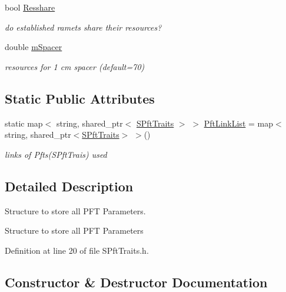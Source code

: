 \begin{DoxyCompactItemize}
bool \mbox{\hyperlink{class_s_pft_traits_aa45d6adb471357506db921078429845e}{Resshare}}
\begin{DoxyCompactList}\small\item\em do established ramets share their resources? \end{DoxyCompactList}\item 
\mbox{\label{class_s_pft_traits_aba851aa2c86f0a498bc8476c14d46e77}} 
double \mbox{\hyperlink{class_s_pft_traits_aba851aa2c86f0a498bc8476c14d46e77}{m\+Spacer}}
\begin{DoxyCompactList}\small\item\em resources for 1 cm spacer (default=70) \end{DoxyCompactList}\end{DoxyCompactItemize}
\subsection*{Static Public Attributes}
\begin{DoxyCompactItemize}
\item 
static map$<$ string, shared\+\_\+ptr$<$ \mbox{\hyperlink{class_s_pft_traits}{S\+Pft\+Traits}} $>$ $>$ \mbox{\hyperlink{class_s_pft_traits_a01285892bf49cb3af31aad380de299ef}{Pft\+Link\+List}} = map$<$ string, shared\+\_\+ptr$<$\mbox{\hyperlink{class_s_pft_traits}{S\+Pft\+Traits}}$>$ $>$()
\begin{DoxyCompactList}\small\item\em links of Pfts(\+S\+Pft\+Trais) used \end{DoxyCompactList}\end{DoxyCompactItemize}


\subsection{Detailed Description}
Structure to store all P\+FT Parameters. 

Structure to store all P\+FT Parameters 

Definition at line 20 of file S\+Pft\+Traits.\+h.



\subsection{Constructor \& Destructor Documentation}
\mbox{\label{class_s_pft_traits_a832b7b9af357d2e0638352ff4960f1d9}} 
